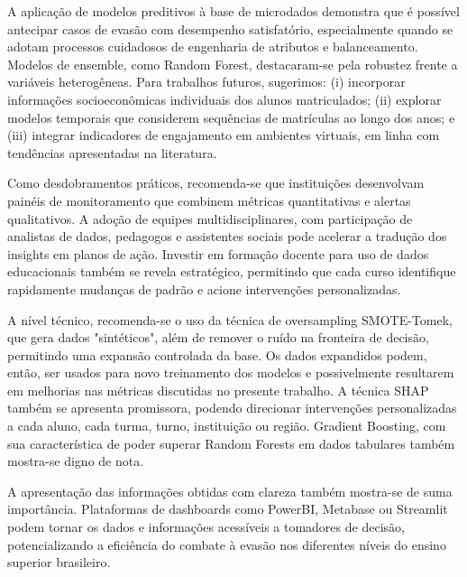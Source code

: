 \documentclass[english, spanish, brazilian]{RBIEarticle} %
\begin{document}
A aplicação de modelos preditivos à base de microdados demonstra que é possível antecipar casos de evasão com desempenho satisfatório, especialmente quando se adotam processos cuidadosos de engenharia de atributos e balanceamento. Modelos de ensemble, como Random Forest, destacaram-se pela robustez frente a variáveis heterogêneas. Para trabalhos futuros, sugerimos: (i) incorporar informações socioeconômicas individuais dos alunos matriculados; (ii) explorar modelos temporais que considerem sequências de matrículas ao longo dos anos; e (iii) integrar indicadores de engajamento em ambientes virtuais, em linha com tendências apresentadas na literatura.

Como desdobramentos práticos, recomenda-se que instituições desenvolvam painéis de monitoramento que combinem métricas quantitativas e alertas qualitativos. A adoção de equipes multidisciplinares, com participação de analistas de dados, pedagogos e assistentes sociais pode acelerar a tradução dos insights em planos de ação. Investir em formação docente para uso de dados educacionais também se revela estratégico, permitindo que cada curso identifique rapidamente mudanças de padrão e acione intervenções personalizadas.

A nível técnico, recomenda-se o uso da técnica de oversampling SMOTE-Tomek, que gera dados "sintéticos", além de remover o ruído na fronteira de decisão, permitindo uma expansão controlada da base. Os dados expandidos podem, então, ser usados para novo treinamento dos modelos e possivelmente resultarem em melhorias nas métricas discutidas no presente trabalho. A técnica SHAP também se apresenta promissora, podendo direcionar intervenções personalizadas a cada aluno, cada turma, turno, instituição ou região. Gradient Boosting, com sua característica de poder superar Random Forests em dados tabulares também mostra-se digno de nota.

A apresentação das informações obtidas com clareza também mostra-se de suma importância. Plataformas de dashboards como PowerBI, Metabase ou Streamlit podem tornar os dados e informações acessíveis a tomadores de decisão, potencializando a eficiência do combate à evasão nos diferentes níveis do ensino superior brasileiro.

\newpage
\printbibliography
\end{document}
